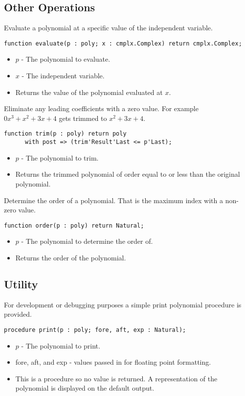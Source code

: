 \documentclass[10pt, openany]{book}
\begin{document}
\subsection{Other Operations}

Evaluate a polynomial at a specific value of the independent variable.
\begin{lstlisting}
function evaluate(p : poly; x : cmplx.Complex) return cmplx.Complex;
\end{lstlisting}
\begin{itemize}
  \item $p$ - The polynomial to evaluate.
  \item $x$ - The independent variable.
  \item Returns the value of the polynomial evaluated at $x$.
\end{itemize}

Eliminate any leading coefficients with a zero value.  For example $0x^3+x^2+3x+4$ gets trimmed to $x^2+3x+4$.
\begin{lstlisting}
function trim(p : poly) return poly
      with post => (trim'Result'Last <= p'Last);
\end{lstlisting}
\begin{itemize}
  \item $p$ - The polynomial to trim.
  \item Returns the trimmed polynomial of order equal to or less than the original polynomial.
\end{itemize}

Determine the order of a polynomial.  That is the maximum index with a non-zero value.
\begin{lstlisting}
function order(p : poly) return Natural;
\end{lstlisting}
\begin{itemize}
  \item $p$ - The polynomial to determine the order of.
  \item Returns the order of the polynomial.
\end{itemize}

\subsection{Utility}
For development or debugging purposes a simple print polynomial procedure is provided.

\begin{lstlisting}
procedure print(p : poly; fore, aft, exp : Natural);
\end{lstlisting}
\begin{itemize}
  \item $p$ - The polynomial to print.
  \item fore, aft, and exp - values passed in for floating point formatting.
  \item This is a procedure so no value is returned.  A representation of the polynomial is displayed on the default output.
\end{itemize}
\end{document}
